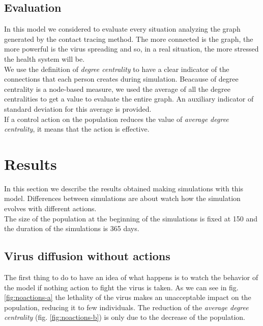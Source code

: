 \documentclass[12pt]{llncs}
\begin{document}
\subsection{Evaluation}
In this model we considered to evaluate every situation analyzing the graph generated by the contact tracing method. The more connected is the graph, the more powerful is the virus spreading and so, in a real situation, the more stressed the health system will be.\\
We use the definition of \textit{degree centrality} to have a clear indicator of the connections that each person creates during simulation. Beacause of degree centrality is a node-based measure, we used the average of all the degree centralities to get a value to evaluate the entire graph. An auxiliary indicator of standard deviation for this average is provided. \\
If a control action on the population reduces the value of \textit{average degree centrality}, it means that the action is effective.

\section{Results}\label{results}
In this section we describe the results obtained making simulations with this model. Differences between simulations are about watch how the simulation evolves with different actions.\\
The size of the population at the beginning of the simulations is fixed at 150 and the duration of the simulations is 365 days.

\subsection{Virus diffusion without actions}
The first thing to do to have an idea of what happens is to watch the behavior of the model if nothing action to fight the virus is taken. As we can see in fig. \ref{fig:noactions-a} the lethality of the virus makes an unacceptable impact on the population, reducing it to few individuals. The reduction of the \textit{average degree centrality} (fig. \ref{fig:noactions-b}) is only due to the decrease of the population.
\end{document}
